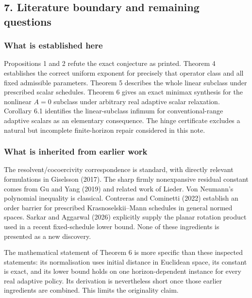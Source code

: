 \documentclass[
  british,
  11pt,
  a4paper,
]{article}
\newcounter{none} %
\let\oldsubsection\subsection
\renewcommand{\subsection}{\Needspace{5\baselineskip}\oldsubsection}
\begin{document}
\subsection{7. Literature boundary and remaining
questions}\label{literature-boundary-and-remaining-questions}

\subsubsection{What is established here}\label{what-is-established-here}

Propositions 1 and 2 refute the exact conjecture as printed. Theorem 4
establishes the correct uniform exponent for precisely that operator
class and all fixed admissible parameters. Theorem 5 describes the whole
linear subclass under prescribed scalar schedules. Theorem 6 gives an
exact minimax synthesis for the nonlinear \(A=0\) subclass under
arbitrary real adaptive scalar relaxation. Corollary 6.1 identifies the
linear-subclass infimum for conventional-range adaptive scalars as an
elementary consequence. The hinge certificate excludes a natural but
incomplete finite-horizon repair considered in this note.

\subsubsection{What is inherited from earlier
work}\label{what-is-inherited-from-earlier-work}

The resolvent/cocoercivity correspondence is standard, with directly
relevant formulations in Giselsson (2017). The sharp firmly nonexpansive
residual constant comes from Gu and Yang (2019) and related work of
Lieder. Von Neumann's polynomial inequality is classical. Contreras and
Cominetti (2022) establish an order barrier for prescribed
Krasnoselskii--Mann schedules in general normed spaces. Sarkar and
Aggarwal (2026) explicitly supply the planar rotation product used in a
recent fixed-schedule lower bound. None of these ingredients is
presented as a new discovery.

The mathematical statement of Theorem 6 is more specific than these
inspected statements: its normalisation uses initial distance in
Euclidean space, its constant is exact, and its lower bound holds on one
horizon-dependent instance for every real adaptive policy. Its
derivation is nevertheless short once those earlier ingredients are
combined. This limits the originality claim.
\end{document}
